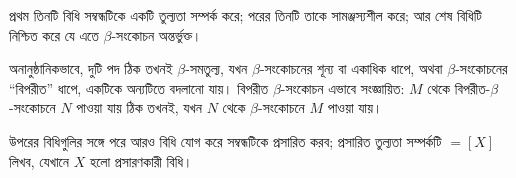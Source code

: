 \documentclass[../../../include/open-logic-section]{subfiles}
\begin{document}
প্রথম তিনটি বিধি সম্বন্ধটিকে একটি তুল্যতা সম্পর্ক করে; পরের তিনটি
তাকে সামঞ্জস্যশীল করে; আর শেষ বিধিটি নিশ্চিত করে যে এতে
$\beta$-সংকোচন অন্তর্ভুক্ত।

অনানুষ্ঠানিকভাবে, দুটি পদ ঠিক তখনই $\beta$-সমতুল্য, যখন
$\beta$-সংকোচনের শূন্য বা একাধিক ধাপে, অথবা $\beta$-সংকোচনের
“বিপরীত” ধাপে, একটিকে অন্যটিতে বদলানো যায়। বিপরীত $\beta$-সংকোচন
এভাবে সংজ্ঞায়িত: $M$ থেকে বিপরীত-$\beta$-সংকোচনে $N$ পাওয়া যায়
ঠিক তখনই, যখন $N$ থেকে $\beta$-সংকোচনে $M$ পাওয়া যায়।

উপরের বিধিগুলির সঙ্গে পরে আরও বিধি যোগ করে সম্বন্ধটিকে প্রসারিত করব;
প্রসারিত তুল্যতা সম্পর্কটি $\equal[X]$ লিখব, যেখানে $X$ হলো
প্রসারণকারী বিধি।
\end{document}
